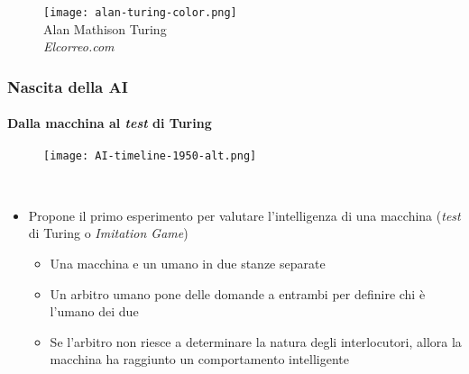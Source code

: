 \begin{frame}[t,fragile]
{\begin{minipage}[t]{\textwidth}
\begin{minipage}[t]{0.6\textwidth}
            	\end{minipage}
            	\begin{minipage}[t]{0.4\textwidth}
                	\centering
                	\begin{figure}[ht]
						\texttt{[image: alan-turing-color.png]}
						{\tiny\\Alan Mathison Turing\\\vspace*{-1pt}\textit{\textcopyright Elcorreo.com}}
                	\end{figure}
            	\end{minipage}
	    	\end{minipage}
	}
\end{frame}
%
\begin{frame}[t,fragile] \frametitle{Nascita della AI}
    {\scriptsize
        \framesubtitle{Dalla macchina al \textit{test} di Turing}
        \vspace*{-15pt}
	    \begin{minipage}[t]{\textwidth}
		    \begin{figure}[ht]
			    \centering
			    \texttt{[image: AI-timeline-1950-alt.png]}
		    \end{figure}
	    \end{minipage}
	    \\\vspace*{3pt}
	    \begin{minipage}[t]{\textwidth}
		    \begin{minipage}[t]{0.6\textwidth}
			    \begin{itemize}[leftmargin=10pt,align=right]
				    \onslide<2->\item[\alert{\faHandORight}] Propone il primo esperimento per valutare l'intelligenza di una macchina (\alert{\textit{test} di Turing} o \alert{\textit{Imitation Game}})
				    \onslide<3->\begin{itemize}[leftmargin=10pt,align=right]
						\item[\alert{\faHandORight}] Una macchina e un umano in due stanze separate
						\item[\alert{\faHandORight}] Un arbitro umano pone delle domande a entrambi per definire chi è l'umano dei due
						\item[\alert{\faHandORight}] Se l'arbitro non riesce a determinare la natura degli interlocutori, allora la macchina ha raggiunto un comportamento intelligente
				    \end{itemize}

\end{itemize}
\end{minipage}
\end{minipage}}
\end{frame}
